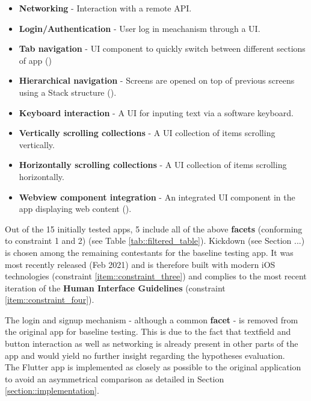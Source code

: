 \begin{itemize}
    \item \textbf{Networking} - Interaction with a remote API.
    \item \textbf{Login/Authentication} - User log in meachanism through a UI.
    \item \textbf{Tab navigation} - UI component to quickly switch between different sections of app (\cite{AppleHIGTabBar2021})
    \item \textbf{Hierarchical navigation} - Screens are opened on top of previous screens using a Stack structure (\cite{AppleHIGNavigation2021}).
    \item \textbf{Keyboard interaction} - A UI for inputing text via a software keyboard.
    \item \textbf{Vertically scrolling collections} - A UI collection of items scrolling vertically.
    \item \textbf{Horizontally scrolling collections} - A UI collection of items scrolling horizontally.
    \item \textbf{Webview component integration} - An integrated UI component in the app displaying web content (\cite{AppleHIGWebViews2021}).
\end{itemize}

Out of the 15 initially tested apps, 5 include all of the above \textbf{facets} (conforming to
constraint 1 and 2) (see Table \ref{tab::filtered_table}). Kickdown (see Section ...) is chosen among the remaining 
contestants for the baseline testing app. It was most recently released (Feb 2021) and is therefore built with modern iOS technologies (constraint \ref{item::constraint_three})
and complies to the most recent iteration of the \textbf{Human Interface Guidelines} (constraint \ref{item::constraint_four}).



The login and signup mechanism - although a common \textbf{facet} - is removed from the original
app for baseline testing. This is due to the fact that textfield and button interaction as well
as networking is already present in other parts of the app and would yield no further insight
regarding the hypotheses evaluation.\\
The Flutter app is implemented as closely as possible to the original application to avoid an
asymmetrical comparison as detailed in Section \ref{section::implementation}.

